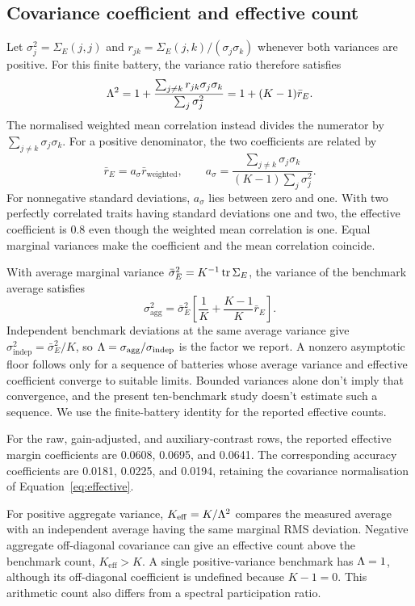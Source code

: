 \subsection{Covariance coefficient and effective count}
Let $\sigma_j^2=\Sigma_E(j,j)$ and $r_{jk}=\Sigma_E(j,k)/(\sigma_j\sigma_k)$ whenever both variances are positive. For this finite battery, the variance ratio therefore satisfies
\begin{equation}
\Lambda^2=1+\frac{\sum_{j\ne k}r_{jk}\sigma_j\sigma_k}{\sum_j\sigma_j^2}
=1+(K-1)\bar r_E.
\end{equation}
The normalised weighted mean correlation instead divides the numerator by $\sum_{j\ne k}\sigma_j\sigma_k$. For a positive denominator, the two coefficients are related by
\begin{equation}
\bar r_E=a_\sigma\bar r_{\mathrm{weighted}},\qquad
a_\sigma=\frac{\sum_{j\ne k}\sigma_j\sigma_k}{(K-1)\sum_j\sigma_j^2}.
\end{equation}
For nonnegative standard deviations, $a_\sigma$ lies between zero and one. With two perfectly correlated traits having standard deviations one and two, the effective coefficient is 0.8 even though the weighted mean correlation is one. Equal marginal variances make the coefficient and the mean correlation coincide.

With average marginal variance $\bar\sigma_E^2=K^{-1}\operatorname{tr}\Sigma_E$, the variance of the benchmark average satisfies
\begin{equation}
\sigma_{\mathrm{agg}}^2=\bar\sigma_E^2\left[\frac1K+\frac{K-1}{K}\bar r_E\right]. \end{equation}
Independent benchmark deviations at the same average variance give $\sigma_{\mathrm{indep}}^2=\bar\sigma_E^2/K$, so $\Lambda=\sigma_{\mathrm{agg}}/\sigma_{\mathrm{indep}}$ is the factor we report. A nonzero asymptotic floor follows only for a sequence of batteries whose average variance and effective coefficient converge to suitable limits. Bounded variances alone don't imply that convergence, and the present ten-benchmark study doesn't estimate such a sequence. We use the finite-battery identity for the reported effective counts.

For the raw, gain-adjusted, and auxiliary-contrast rows, the reported effective margin coefficients are 0.0608, 0.0695, and 0.0641. The corresponding accuracy coefficients are 0.0181, 0.0225, and 0.0194, retaining the covariance normalisation of Equation~\ref{eq:effective}.

For positive aggregate variance, $K_{\mathrm{eff}}=K/\Lambda^2$ compares the measured average with an independent average having the same marginal RMS deviation. Negative aggregate off-diagonal covariance can give an effective count above the benchmark count, $K_{\mathrm{eff}}>K$. A single positive-variance benchmark has $\Lambda=1$, although its off-diagonal coefficient is undefined because $K-1=0$. This arithmetic count also differs from a spectral participation ratio.

